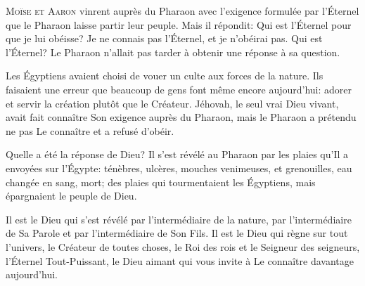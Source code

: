 


\lettrine{M}{oïse et Aaron} vinrent auprès du Pharaon
 avec l'exigence formulée par l'Éternel que le Pharaon
 laisse partir leur peuple.
 Mais il répondit: \Og Qui est l'Éternel pour que je lui obéisse? Je ne connais pas l'Éternel,
 et je n'obéirai pas. \Fg{}
 Qui est l'Éternel? Le Pharaon n'allait pas tarder
 à obtenir une réponse à sa question.

Les Égyptiens avaient choisi de vouer un culte aux forces de la nature.
 Ils faisaient une erreur que beaucoup de gens font même encore aujourd'hui:
 adorer et servir la création plutôt que le Créateur.
 Jéhovah, le seul vrai Dieu vivant, avait fait connaître Son exigence
 auprès du Pharaon, mais le Pharaon a prétendu
 ne pas Le connaître et a refusé d'obéir.

Quelle a été la réponse de Dieu? Il s'est révélé au Pharaon
 par les plaies qu'Il a envoyées sur l'Égypte:
 ténèbres, ulcères, mouches venimeuses, et grenouilles,
 eau changée en sang, mort; des plaies qui tourmentaient les Égyptiens,
 mais épargnaient le peuple de Dieu.


Il est le Dieu qui s'est révélé par l'intermédiaire de la nature,
 par l'intermédiaire de Sa Parole et par l'intermédiaire de Son Fils.
 Il est le Dieu qui règne sur tout l'univers, le Créateur de toutes choses,
 le Roi des rois et le Seigneur des seigneurs,
 l'Éternel Tout-Puissant, le Dieu aimant
 qui vous invite à Le connaître davantage aujourd'hui. 

\dvrule




